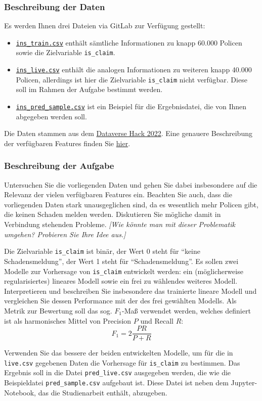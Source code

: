 \documentclass[11pt,a4paper]{article}
\begin{document}
\subsubsection*{Beschreibung der Daten}
Es werden Ihnen drei Dateien via GitLab zur Verfügung gestellt:
\begin{itemize}
	\item \href{https://gitlab.lrz.de/christian-moeller/machine-learning/-/raw/main/Studienarbeit/data/ins_train.csv}{\texttt{ins\_train.csv}} enthält sämtliche Informationen zu knapp 60.000 Policen sowie die Zielvariable \texttt{is\_claim}.
	\item \href{https://gitlab.lrz.de/christian-moeller/machine-learning/-/raw/main/Studienarbeit/data/ins_live.csv}{\texttt{ins\_live.csv}} enthält die analogen Informationen zu weiteren knapp 40.000 Policen, allerdings ist hier die Zielvariable \texttt{is\_claim} nicht verfügbar. Diese soll im Rahmen der Aufgabe bestimmt werden.
	\item \href{https://gitlab.lrz.de/christian-moeller/machine-learning/-/raw/main/Studienarbeit/data/ins_pred_sample}{\texttt{ins\_pred\_sample.csv}} ist ein Beispiel für die Ergebnisdatei, die von Ihnen abgegeben werden soll.
\end{itemize}
Die Daten stammen aus dem \href{https://datahack.analyticsvidhya.com/contest/dataverse/}{Dataverse Hack 2022}. Eine genauere Beschreibung der verfügbaren Features finden Sie \href{https://gitlab.lrz.de/christian-moeller/machine-learning/-/raw/main/Studienarbeit/data/ins_description.md}{hier}.

\subsubsection*{Beschreibung der Aufgabe}
Untersuchen Sie die vorliegenden Daten und gehen Sie dabei insbesondere auf die Relevanz der vielen verfügbaren Features ein. Beachten Sie auch, dass die vorliegenden Daten stark unausgeglichen sind, da es wesentlich mehr Policen gibt, die keinen Schaden melden werden. Diskutieren Sie mögliche damit in Verbindung stehenden Probleme. \emph{[Wie könnte man mit dieser Problematik umgehen? Probieren Sie Ihre Idee aus.]}

 Die Zielvariable \texttt{is\_claim} ist binär, der Wert 0 steht für ``keine Schadensmeldung'', der Wert 1 steht für ``Schadensmeldung''. Es sollen zwei Modelle zur Vorhersage von \texttt{is\_claim} entwickelt werden: ein (möglicherweise regularisiertes) lineares Modell sowie ein frei zu wählendes weiteres Modell. Interpretieren und beschreiben Sie insbesondere das trainierte lineare Modell und vergleichen Sie dessen Performance mit der des frei gewählten Modells. Als Metrik zur Bewertung soll das sog. $F_1$-Maß verwendet werden, welches definiert ist als harmonisches Mittel von Precision $P$ und Recall $R$:
 $$F_1 = 2\frac{PR}{P+R}$$

 Verwenden Sie das bessere der beiden entwickelten Modelle, um für die in \texttt{live.csv} gegebenen Daten die Vorhersage für \texttt{is\_claim} zu bestimmen. Das Ergebnis soll in die Datei \texttt{pred\_live.csv} ausgegeben werden, die wie die Beispieldatei \texttt{pred\_sample.csv} aufgebaut ist. Diese Datei ist neben dem Jupyter-Notebook, das die Studienarbeit enthält, abzugeben.
\end{document}
